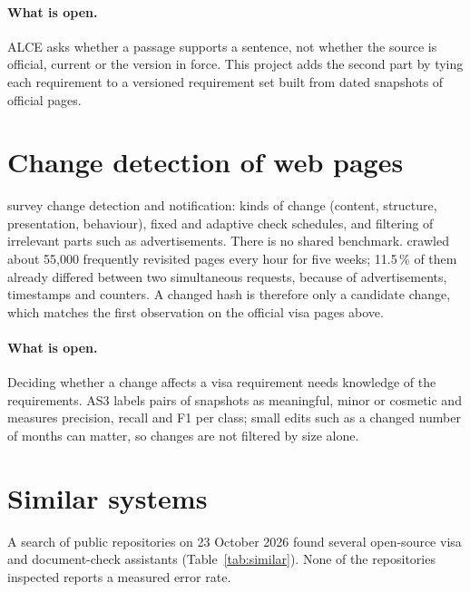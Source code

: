 \paragraph{What is open.} ALCE asks whether a passage supports a sentence, not whether the source
is official, current or the version in force. This project adds the second part by tying each
requirement to a versioned requirement set built from dated snapshots of official pages.

\section{Change detection of web pages}\label{sec:change-detection}
\textcite{mallawaarachchi2020change} survey change detection and notification: kinds of change
(content, structure, presentation, behaviour), fixed and adaptive check schedules, and filtering
of irrelevant parts such as advertisements. There is no shared benchmark. \textcite{adar2009web}
crawled about 55,000 frequently revisited pages every hour for five weeks; 11.5\,\% of them
already differed between two simultaneous requests, because of advertisements, timestamps and
counters. A changed hash is therefore only a candidate change, which matches the first
observation on the official visa pages above.

\paragraph{What is open.} Deciding whether a change affects a visa requirement needs knowledge of
the requirements. AS3 labels pairs of snapshots as meaningful, minor or cosmetic and measures
precision, recall and F1 per class; small edits such as a changed number of months can matter,
so changes are not filtered by size alone.

\section{Similar systems}\label{sec:similar}
A search of public repositories on 23 October 2026 found several open-source visa and
document-check assistants (Table~\ref{tab:similar}). None of the repositories inspected reports a
measured error rate.

